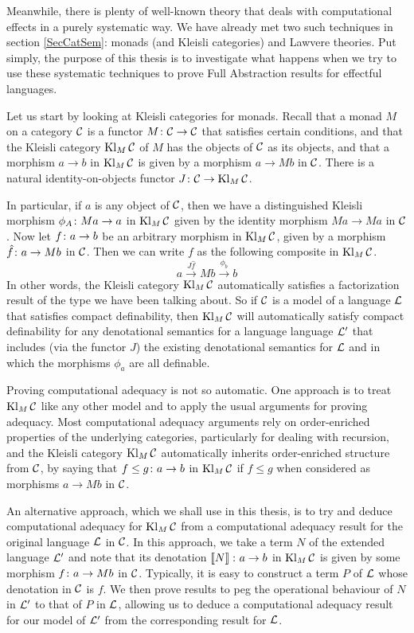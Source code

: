 \documentclass[11pt]{report}
\begin{document}
Meanwhile, there is plenty of well-known theory that deals with computational effects in a purely systematic way.  
We have already met two such techniques in section \ref{SecCatSem}: monads (and Kleisli categories) and Lawvere theories.
Put simply, the purpose of this thesis is to investigate what happens when we try to use these systematic techniques to prove Full Abstraction results for effectful languages.

Let us start by looking at Kleisli categories for monads.  
Recall that a monad $M$ on a category ${\mathcal{C}}$ is a functor $M \colon {\mathcal{C}} \to {\mathcal{C}}$ that satisfies certain conditions, and that the Kleisli category $\operatorname{Kl}_M{\mathcal{C}}$ of $M$ has the objects of ${\mathcal{C}}$ as its objects, and that a morphism $a \to b$ in $\operatorname{Kl}_M{\mathcal{C}}$ is given by a morphism $a \to Mb$ in ${\mathcal{C}}$.
There is a natural identity-on-objects functor $J\colon {\mathcal{C}} \to \operatorname{Kl}_M{\mathcal{C}}$.

In particular, if $a$ is any object of ${\mathcal{C}}$, then we have a distinguished Kleisli morphism $\phi_A\colon Ma \to a$ in $\operatorname{Kl}_M{\mathcal{C}}$ given by the identity morphism $Ma \to Ma$ in ${\mathcal{C}}$.
Now let $f\colon a \to b$ be an arbitrary morphism in $\operatorname{Kl}_M{\mathcal{C}}$, given by a morphism $\hat f\colon a \to Mb$ in ${\mathcal{C}}$.
Then we can write $f$ as the following composite in $\operatorname{Kl}_M{\mathcal{C}}$.
\[
  a \xrightarrow{J\hat{f}} Mb \xrightarrow{\phi_b} b
  \]
In other words, the Kleisli category $\operatorname{Kl}_M{\mathcal{C}}$ automatically satisfies a factorization result of the type we have been talking about.  
So if ${\mathcal{C}}$ is a model of a language $\mathcal L$ that satisfies compact definability, then $\operatorname{Kl}_M{\mathcal{C}}$ will automatically satisfy compact definability for any denotational semantics for a language language $\mathcal L'$ that includes (via the functor $J$) the existing denotational semantics for $\mathcal L$ and in which the morphisms $\phi_a$ are all definable.

Proving computational adequacy is not so automatic.  
One approach is to treat $\operatorname{Kl}_M{\mathcal{C}}$ like any other model and to apply the usual arguments for proving adequacy.  
Most computational adequacy arguments rely on order-enriched properties of the underlying categories, particularly for dealing with recursion, and the Kleisli category $\operatorname{Kl}_M{\mathcal{C}}$ automatically inherits order-enriched structure from ${\mathcal{C}}$, by saying that $f\le g\colon a \to b$ in $\operatorname{Kl}_M{\mathcal{C}}$ if $f\le g$ when considered as morphisms $a \to Mb$ in ${\mathcal{C}}$.

An alternative approach, which we shall use in this thesis, is to try and deduce computational adequacy for $\operatorname{Kl}_M{\mathcal{C}}$ from a computational adequacy result for the original language $\mathcal L$ in ${\mathcal{C}}$.  
In this approach, we take a term $N$ of the extended language $\mathcal L'$ and note that its denotation $\left\llbracket N\right\rrbracket \colon a \to b$ in $\operatorname{Kl}_M{\mathcal{C}}$ is given by some morphism $f \colon a \to Mb$ in ${\mathcal{C}}$.  
Typically, it is easy to construct a term $P$ of $\mathcal L$ whose denotation in ${\mathcal{C}}$ is $f$.
We then prove results to peg the operational behaviour of $N$ in $\mathcal L'$ to that of $P$ in $\mathcal L$, allowing us to deduce a computational adequacy result for our model of $\mathcal L'$ from the corresponding result for $\mathcal L$.
\end{document}
